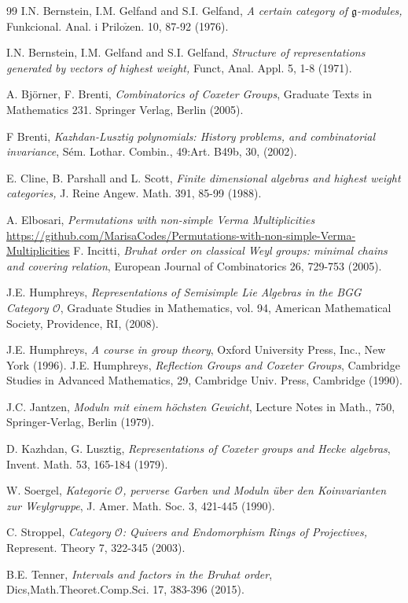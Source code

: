 \documentclass[a4 paper,12pt]{article}
\newcommand{\ger}[1]{\mathfrak{#1}}
\newcommand{\OO}{\mathcal{O}}
\begin{document}
\begin{small}
\begin{thebibliography}{99}
  I.N. Bernstein, I.M. Gelfand and S.I. Gelfand, \textit{A certain category of $\ger{g}$-modules,}  
Funkcional. Anal. i Prilo$\check{\text{z}}$en.  10, 87-92 (1976).


 I.N. Bernstein, I.M. Gelfand and S.I. Gelfand, \textit{Structure of representations generated by vectors of highest weight,} Funct, Anal. Appl. 5, 1-8 (1971).




 A. Bj\"orner, F. Brenti, \textit{Combinatorics of Coxeter Groups}, Graduate Texts in Mathematics 231. Springer Verlag, Berlin (2005).



 F Brenti,  \textit{Kazhdan-Lusztig polynomials: History problems, and combinatorial invariance},
Sém. Lothar. Combin., 49:Art. B49b, 30, (2002).

  E. Cline, B. Parshall and  L. Scott,   \textit{Finite dimensional algebras and highest weight categories,} J. Reine Angew. Math. 391, 85-99 (1988).



 A. Elbosari, \textit{Permutations with non-simple Verma Multiplicities}\\ \url{https://github.com/MarisaCodes/Permutations-with-non-simple-Verma-Multiplicities}
 F. Incitti, \textit{Bruhat order on classical Weyl groups: minimal chains
and covering relation}, European Journal of Combinatorics  26, 729-753 (2005).


 J.E. Humphreys, \textit{Representations of Semisimple Lie Algebras in the BGG Category $\OO$}, Graduate Studies in Mathematics, vol. 
94, American Mathematical Society, Providence, RI, (2008).


 J.E. Humphreys, \textit{A course in group theory}, Oxford University Press, Inc., New
York (1996).  
 J.E. Humphreys, \textit{Reflection Groups and Coxeter Groups},  Cambridge Studies in Advanced
Mathematics, 29, Cambridge Univ. Press, Cambridge (1990).




 J.C. Jantzen, \textit{Moduln mit einem h\"ochsten Gewicht},  Lecture Notes in Math., 750, Springer-Verlag, Berlin (1979).

 D. Kazhdan, G. Lusztig, \textit{Representations of Coxeter groups and Hecke
algebras}, Invent. Math. 53, 165-184 (1979).


 W. Soergel, \textit{Kategorie $\OO$, perverse Garben und Moduln \"uber den Koinvarianten zur
Weylgruppe}, J. Amer. Math. Soc. 3, 421-445  (1990).

  C. Stroppel,  \textit{Category $\mathcal{O}$: Quivers and Endomorphism Rings of Projectives,}   Represent. Theory 7,  322-345 (2003).

 B.E. Tenner,  \textit{Intervals and factors in the Bruhat order}, Dics,Math.Theoret.Comp.Sci. 17, 383-396 (2015).
\end{thebibliography}
\end{small}
\end{document}
